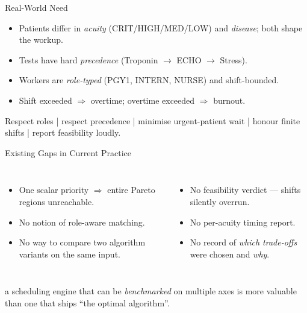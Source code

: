 \documentclass[aspectratio=169, 11pt]{beamer}
\begin{document}
\begin{frame}{Real-World Need}
  \begin{itemize}
    \item Patients differ in \emph{acuity} (CRIT/HIGH/MED/LOW) and
          \emph{disease}; both shape the workup.
    \item Tests have hard \emph{precedence} (Troponin $\to$ ECHO $\to$ Stress).
    \item Workers are \emph{role-typed} (PGY1, INTERN, NURSE) and
          shift-bounded.
    \item Shift exceeded $\Rightarrow$ overtime; overtime exceeded
          $\Rightarrow$ burnout.
  \end{itemize}
  \vspace{0.6em}
  \begin{insight}
    \;
    Respect roles \;|\; respect precedence \;|\; minimise urgent-patient
    wait \;|\; honour finite shifts \;|\; report feasibility loudly.
  \end{insight}
\end{frame}

\begin{frame}{Existing Gaps in Current Practice}
  \begin{columns}[T,onlytextwidth]
      \begin{itemize}
        \item One scalar priority $\Rightarrow$ entire Pareto regions
              unreachable.
        \item No notion of role-aware matching.
        \item No way to compare two algorithm variants on the
              same input.
      \end{itemize}
      \begin{itemize}
        \item No feasibility verdict --- shifts silently overrun.
        \item No per-acuity timing report.
        \item No record of \emph{which trade-offs} were chosen and
              \emph{why}.
      \end{itemize}
  \end{columns}
  \vspace{0.4em}
  \begin{insight}
    a scheduling engine that can be \emph{benchmarked} on multiple
    axes is more valuable than one that ships ``the optimal algorithm''.
  \end{insight}
\end{frame}
\end{document}
